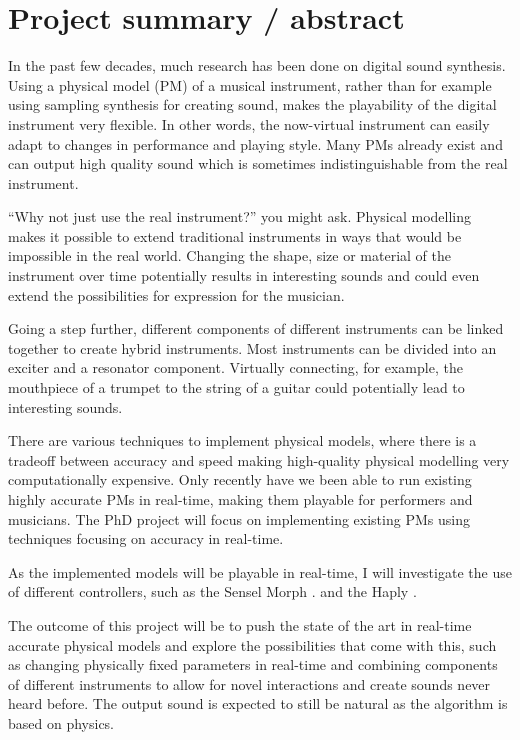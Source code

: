 \section{Project summary / abstract}

In the past few decades, much research has been done on digital sound synthesis. Using a physical model (PM) of a musical instrument, rather than for example using sampling synthesis for creating sound, makes the playability of the digital instrument very flexible. In other words, the now-virtual instrument can easily adapt to changes in performance and playing style. Many PMs already exist and can output high quality sound which is sometimes indistinguishable from the real instrument.

“Why not just use the real instrument?” you might ask. Physical modelling makes it possible to extend traditional instruments in ways that would be impossible in the real world. Changing the shape, size or material of the instrument over time potentially results in interesting sounds and could even extend the possibilities for expression for the musician. 

Going a step further, different components of different instruments can be linked together to create hybrid instruments. Most instruments can be divided into an exciter and a resonator component. Virtually connecting, for example, the mouthpiece of a trumpet to the string of a guitar could potentially lead to interesting sounds.

There are various techniques to implement physical models, where there is a tradeoff between accuracy and speed making high-quality physical modelling very computationally expensive. Only recently have we been able to run existing highly accurate PMs in real-time, making them playable for performers and musicians. The PhD project will focus on implementing existing PMs using techniques focusing on accuracy in real-time.

As the implemented models will be playable in real-time, I will investigate the use of different controllers, such as the Sensel Morph \cite{Sensel2019}. and the Haply \cite{Haply2019}.

The outcome of this project will be to push the state of the art in real-time accurate physical models and explore the possibilities that come with this, such as changing physically fixed parameters in real-time and combining components of different instruments to allow for novel interactions and create sounds never heard before. The output sound is expected to still be natural as the algorithm is based on physics.

